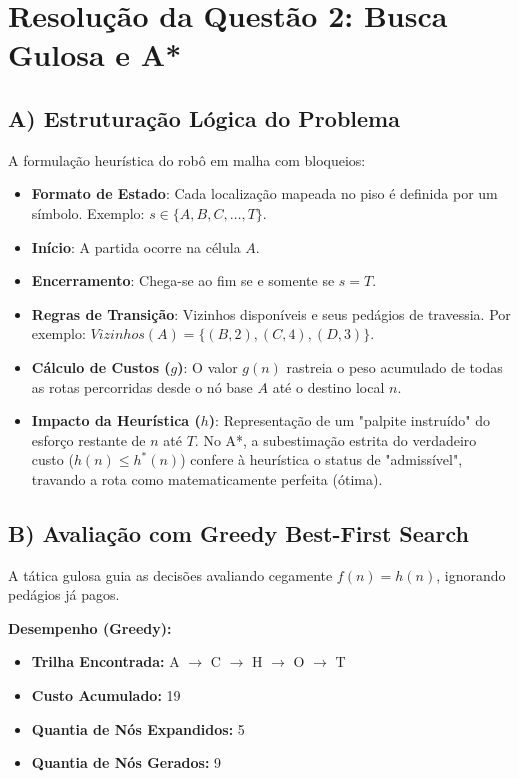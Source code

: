 \section*{Resolução da Questão 2: Busca Gulosa e A*}

\subsection*{A) Estruturação Lógica do Problema}

A formulação heurística do robô em malha com bloqueios:

\begin{itemize}
    \item \textbf{Formato de Estado}: Cada localização mapeada no piso é definida por um símbolo. Exemplo: $s \in \{A, B, C, \dots, T\}$.
    \item \textbf{Início}: A partida ocorre na célula $A$.
    \item \textbf{Encerramento}: Chega-se ao fim se e somente se $s = T$.
    \item \textbf{Regras de Transição}: Vizinhos disponíveis e seus pedágios de travessia. Por exemplo: $Vizinhos(A) = \{(B, 2), (C, 4), (D, 3)\}$.
    \item \textbf{Cálculo de Custos ($g$)}: O valor $g(n)$ rastreia o peso acumulado de todas as rotas percorridas desde o nó base $A$ até o destino local $n$.
    \item \textbf{Impacto da Heurística ($h$)}: Representação de um "palpite instruído" do esforço restante de $n$ até $T$. No A*, a subestimação estrita do verdadeiro custo ($h(n) \le h^*(n)$) confere à heurística o status de "admissível", travando a rota como matematicamente perfeita (ótima).
\end{itemize}

\subsection*{B) Avaliação com Greedy Best-First Search}

A tática gulosa guia as decisões avaliando cegamente $f(n) = h(n)$, ignorando pedágios já pagos.

\textbf{Desempenho (Greedy):}
\begin{itemize}
    \item \textbf{Trilha Encontrada:} A $\rightarrow$ C $\rightarrow$ H $\rightarrow$ O $\rightarrow$ T
    \item \textbf{Custo Acumulado:} 19
    \item \textbf{Quantia de Nós Expandidos:} 5
    \item \textbf{Quantia de Nós Gerados:} 9
\end{itemize}

